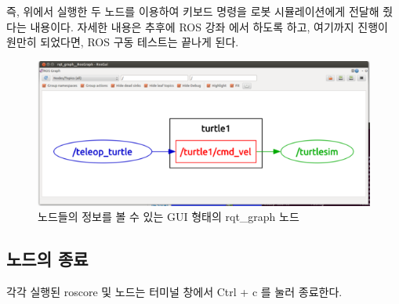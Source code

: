 즉, 위에서 실행한 두 노드를 이용하여 키보드 명령을 로봇 시뮬레이션에게 전달해 줬다는 내용이다. 자세한 내용은 추후에 ROS 강좌 에서 하도록 하고, 여기까지 진행이 원만히 되었다면, ROS 구동 테스트는 끝나게 된다.

\begin{figure}[h]
\centering\includegraphics[width=0.8\columnwidth]{pictures/chapter2/turtlesim_node_graph.png}
\caption{노드들의 정보를 볼 수 있는 GUI 형태의 rqt\_graph 노드}
\end{figure}

\subsection{노드의 종료}

각각 실행된 roscore 및 노드는 터미널 창에서 Ctrl + c 를 눌러 종료한다.

